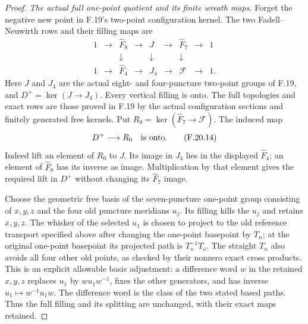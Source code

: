 \begin{proof}
\emph{The actual full one-point quotient and its finite wreath maps.}
Forget the negative new point in F.19's two-point
configuration kernel. The two Fadell--Neuwirth rows
and their filling maps are
\[
 \begin{array}{ccccccccc}
 1&\longrightarrow&\widehat F_8&\longrightarrow&J
                 &\longrightarrow&\widehat F_7&\longrightarrow&1\\
 &&\downarrow&&\downarrow&&\downarrow\\
 1&\longrightarrow&\widehat F_4&\longrightarrow&J_4
                 &\longrightarrow&\mathcal F&\longrightarrow&1 .
 \end{array}                                                  \tag{F.20.13}
\]
Here $J$ and $J_4$ are the actual eight- and four-puncture
two-point groups of F.19, and $D^+=\ker(J\to J_4)$.
Every vertical filling is onto. The full topologies
and exact rows are those proved in F.19 by the
actual configuration sections and finitely generated
free kernels.
Put $R_0=\ker(\widehat F_7\to\mathcal F)$.
The induced map
\[
                         D^+\longrightarrow R_0
                         \quad\hbox{is onto}.               \tag{F.20.14}
\]
Indeed lift an element of $R_0$ to $J$.
Its image in $J_4$ lies in the displayed $\widehat F_4$;
an element of $\widehat F_8$ has its inverse as image.
Multiplication by that element gives the required
lift in $D^+$ without changing its $\widehat F_7$ image.

Choose the geometric free basis of the seven-puncture
one-point group consisting of $x,y,z$ and the four old
puncture meridians $u_j$. Its filling kills the $u_j$
and retains $x,y,z$. The whisker of the selected
$u_1$ is chosen to project to the old reference
transport specified above after changing the
one-point basepoint by $T_n$; at the original
one-point basepoint its projected path is
$T_n^{-1}T_o$. The straight $T_n$ also avoids
all four other old points, as checked by their
nonzero exact cross products.
This is an explicit
allowable basis adjustment: a difference word $w$
in the retained $x,y,z$ replaces $u_1$ by
$wu_1w^{-1}$, fixes the other generators, and has
inverse $u_1\mapsto w^{-1}u_1w$.
The difference word is the class of the two stated
based paths. Thus the full filling and its splitting
are unchanged, with their exact maps retained.


\end{proof}

